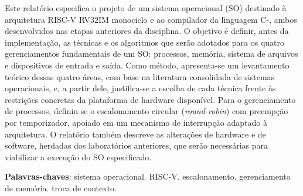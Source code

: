 \documentclass[
	12pt,				%
	openright,			%
	a4paper,			%
	english,			%
	french,				%
	spanish,			%
	brazilian,				%
	]{abntex2}
\begin{document}

\frenchspacing 


\imprimircapa

\imprimirfolhaderosto*

\setlength{\absparsep}{18pt} %
\begin{resumo}
Este relatório especifica o projeto de um sistema operacional (SO) destinado à
arquitetura RISC-V RV32IM monociclo e ao compilador da linguagem C-, ambos
desenvolvidos nas etapas anteriores da disciplina. O objetivo é definir, antes da
implementação, as técnicas e os algoritmos que serão adotados para os quatro
gerenciamentos fundamentais de um SO: processos, memória, sistema de arquivos e
dispositivos de entrada e saída. Como método, apresenta-se um levantamento teórico
dessas quatro áreas, com base na literatura consolidada de sistemas operacionais, e,
a partir dele, justifica-se a escolha de cada técnica frente às restrições concretas
da plataforma de hardware disponível. Para o gerenciamento de processos, definiu-se
o escalonamento circular (\emph{round-robin}) com preempção por temporizador, apoiado
em um mecanismo de interrupção adaptado à arquitetura. O relatório também descreve as
alterações de hardware e de software, herdadas dos laboratórios anteriores, que serão
necessárias para viabilizar a execução do SO especificado.

\noindent
\textbf{Palavras-chaves}: sistema operacional. RISC-V. escalonamento. gerenciamento de memória. troca de contexto.
\end{resumo}

\listoffigures*
\clearpage

\listoftables*
\clearpage

\tableofcontents*


\textual
\end{document}
